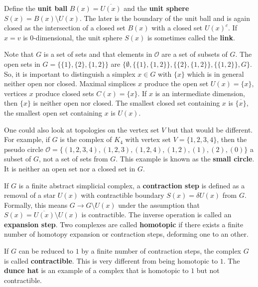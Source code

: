 \documentclass[12pt]{amsart}
\begin{document}
\vspace{3mm}
Define the {\bf unit ball} $B(x) = \overline{U(x)}$ and
the {\bf unit sphere } $S(x) = B(x) \setminus U(x)$. The later is the boundary 
of the unit ball and is again closed as the intersection of a closed set $B(x)$ with 
a closed set $U(x)^c$. If $x=v$ is 0-dimensional, the
unit sphere $S(x)$ is sometimes called the {\bf link}. 

\vspace{3mm}
Note that $G$ is a set of sets and that elements in $\mathcal{O}$ are a set of subsets 
of $G$. The open sets in $G=\{ \{1\},\{2\},\{1,2\} \}$ 
are $\{ \emptyset, \{ \{1\},\{1,2\} \}, \{ \{2\},\{1,2\} \}, \{ \{1,2\} \}, G \}$.
So, it is important to distinguish a simplex $x \in G$ with $\{ x \}$ which is 
in general neither open nor closed. Maximal simplices $x$ produce the open set $U(x) = \{ x\}$, 
vertices $x$ produce closed sets $C(x) = \{x\}$. If $x$ is an intermediate dimension, 
then $\{x\}$ is neither open nor closed. The smallest closed set containing $x$ is 
$\overline{ \{ x \}}$, the smallest open set containing $x$ is $U(x)$. 

\vspace{3mm}
One could also look at topologies on the vertex set $V$ but that would be different. 
For example, if $G$ is the complex of $K_4$ with vertex set $V=\{1,2,3,4\}$, then
the pseudo circle $\mathcal{O} = \{ (1,2,3,4),(1,2,3),(1,2,4),(1,2),(1),(2),(0) \}$ 
a subset of $G$, not a set of sets from $G$. This example is known as the {\bf small circle}.
It is neither an open set nor a closed set in $G$. 


\vspace{3mm}
If $G$ is a finite abstract simplicial complex, 
a {\bf contraction step} is defined as a removal of a star $U(x)$
with contractible boundary $S(x)=\delta U(x)$ from $G$. Formally, this means
$G \to G \setminus U(x)$ under the assumption that 
$S(x) = \overline{U(x)} \setminus U(x)$ is contractible. 
The inverse operation is called an {\bf expansion step}. Two complexes 
are called {\bf homotopic} if there exists a finite number of homotopy expansion or 
contraction steps, deforming one to an other. 

\vspace{3mm}
If $G$ can be reduced to $1$ by a finite number of contraction 
steps, the complex $G$ is called {\bf contractible}. This is 
very different from being  homotopic to $1$. The {\bf dunce hat} is an 
example of a complex that is homotopic to $1$ but not contractible. 
\end{document}
